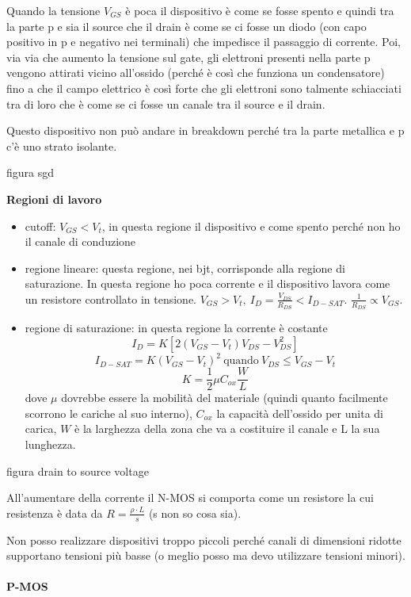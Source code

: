 \documentclass[
]{article}
\providecommand{\tightlist}{%
  \setlength{\itemsep}{0pt}\setlength{\parskip}{0pt}}
\begin{document}
Quando la tensione \(V_{GS}\) è poca il dispositivo è come se fosse
spento e quindi tra la parte p e sia il source che il drain è come se ci
fosse un diodo (con capo positivo in p e negativo nei terminali) che
impedisce il passaggio di corrente. Poi, via via che aumento la tensione
sul gate, gli elettroni presenti nella parte p vengono attirati vicino
all'ossido (perché è così che funziona un condensatore) fino a che il
campo elettrico è così forte che gli elettroni sono talmente schiacciati
tra di loro che è come se ci fosse un canale tra il source e il drain.

Questo dispositivo non può andare in breakdown perché tra la parte
metallica e p c'è uno strato isolante.

figura sgd

\textbf{Regioni di lavoro}

\begin{itemize}
\tightlist
\item
  cutoff: \(V_{GS}<V_{t}\), in questa regione il dispositivo e come
  spento perché non ho il canale di conduzione
\item
  regione lineare: questa regione, nei bjt, corrisponde alla regione di
  saturazione. In questa regione ho poca corrente e il dispositivo
  lavora come un resistore controllato in tensione. \(V_{GS}>V_{t},\
  I_{D}=\frac{V_{DS}}{R_{DS}}<I_{D-SAT}\).
  \(\frac{1}{R_{DS}}\propto V_{GS}\).
\item
  regione di saturazione: in questa regione la corrente è costante
  \[I_{D}
  = K[2(V_{GS}-V_{t})V_{DS}-V_{DS}^{2}]\]
  \[I_{D-SAT} = K(V_{GS}-V_{t})^{2}\ \text{quando}\
  V_{DS}\leq V_{GS}-V_{t}\] \[K = \frac{1}{2}\mu C_{ox}\frac{W}{L}\]
  dove \(\mu\) dovrebbe essere la mobilità del materiale (quindi quanto
  facilmente scorrono le cariche al suo interno), \(C_{ox}\) la capacità
  dell'ossido per unita di carica, \(W\) è la larghezza della zona che
  va a costituire il canale e L la sua lunghezza.
\end{itemize}

figura drain to source voltage

All'aumentare della corrente il N-MOS si comporta come un resistore la
cui resistenza è data da \(R=\frac{\rho\cdot L}{s}\) (s non so cosa
sia).

Non posso realizzare dispositivi troppo piccoli perché canali di
dimensioni ridotte supportano tensioni più basse (o meglio posso ma devo
utilizzare tensioni minori).

\paragraph{P-MOS}\label{p-mos}
\end{document}
